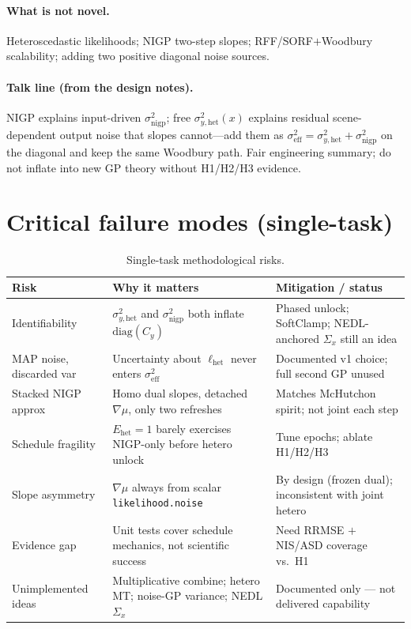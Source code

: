 \documentclass[11pt]{article}
\newcommand{\sighet}{\sigma_{y,\mathrm{het}}^{2}}
\newcommand{\signigp}{\sigma_{\mathrm{nigp}}^{2}}
\newcommand{\sigeff}{\sigma_{\mathrm{eff}}^{2}}
\newcommand{\Sigx}{\Sigma_{x}}
\newcommand{\Cy}{C_{y}}
\begin{document}
\paragraph{What is not novel.}
Heteroscedastic likelihoods; NIGP two-step slopes; RFF/SORF$+$Woodbury scalability;
adding two positive diagonal noise sources.

\paragraph{Talk line (from the design notes).}
NIGP explains input-driven $\signigp$; free $\sighet(x)$ explains residual
scene-dependent output noise that slopes cannot---add them as
$\sigeff=\sighet+\signigp$ on the diagonal and keep the same Woodbury path.
Fair engineering summary; do not inflate into new GP theory without H1/H2/H3
evidence.

\FloatBarrier
\section{Critical failure modes (single-task)}
\label{sec:risks}

\begin{table}[H]
\centering
\small
\begin{tabular}{@{}>{\raggedright\arraybackslash}p{2.4cm}
  >{\raggedright\arraybackslash}p{4.6cm}
  >{\raggedright\arraybackslash}p{4.6cm}@{}}
\toprule
\textbf{Risk} & \textbf{Why it matters} & \textbf{Mitigation / status} \\
\midrule
Identifiability
& $\sighet$ and $\signigp$ both inflate $\mathrm{diag}(\Cy)$
& Phased unlock; SoftClamp; NEDL-anchored $\Sigx$ still an idea \\
MAP noise, discarded var
& Uncertainty about $\ell_{\mathrm{het}}$ never enters $\sigeff$
& Documented v1 choice; full second GP unused \\
Stacked NIGP approx
& Homo dual slopes, detached $\nabla\mu$, only two refreshes
& Matches McHutchon spirit; not joint each step \\
Schedule fragility
& $E_{\mathrm{het}}=1$ barely exercises NIGP-only before hetero unlock
& Tune epochs; ablate H1/H2/H3 \\
Slope asymmetry
& $\nabla\mu$ always from scalar \texttt{likelihood.noise}
& By design (frozen dual); inconsistent with joint hetero \\
Evidence gap
& Unit tests cover schedule mechanics, not scientific success
& Need RRMSE $+$ NIS/ASD coverage vs.\ H1 \\
Unimplemented ideas
& Multiplicative combine; hetero MT; noise-GP variance; NEDL $\Sigx$
& Documented only --- not delivered capability \\
\bottomrule
\end{tabular}
\caption{Single-task methodological risks.}
\label{tab:risks}
\end{table}
\end{document}
